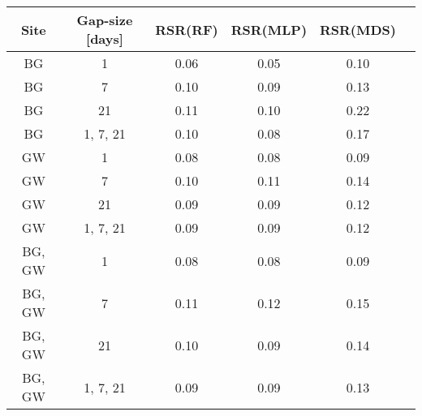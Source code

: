 \begin{tabular}{|c|c|c|c|c|c|}
\toprule
Site & Gap-size [days] & RSR(RF) & RSR(MLP) & RSR(MDS) \\
\midrule
BG & 1 & 0.06 & 0.05 & 0.10 \\
BG & 7 & 0.10 & 0.09 & 0.13 \\
BG & 21 & 0.11 & 0.10 & 0.22 \\
BG & 1, 7, 21 & 0.10 & 0.08 & 0.17 \\
GW & 1 & 0.08 & 0.08 & 0.09 \\
GW & 7 & 0.10 & 0.11 & 0.14 \\
GW & 21 & 0.09 & 0.09 & 0.12 \\
GW & 1, 7, 21 & 0.09 & 0.09 & 0.12 \\
BG, GW & 1 & 0.08 & 0.08 & 0.09 \\
BG, GW & 7 & 0.11 & 0.12 & 0.15 \\
BG, GW & 21 & 0.10 & 0.09 & 0.14 \\
BG, GW & 1, 7, 21 & 0.09 & 0.09 & 0.13 \\
\bottomrule
\end{tabular}

